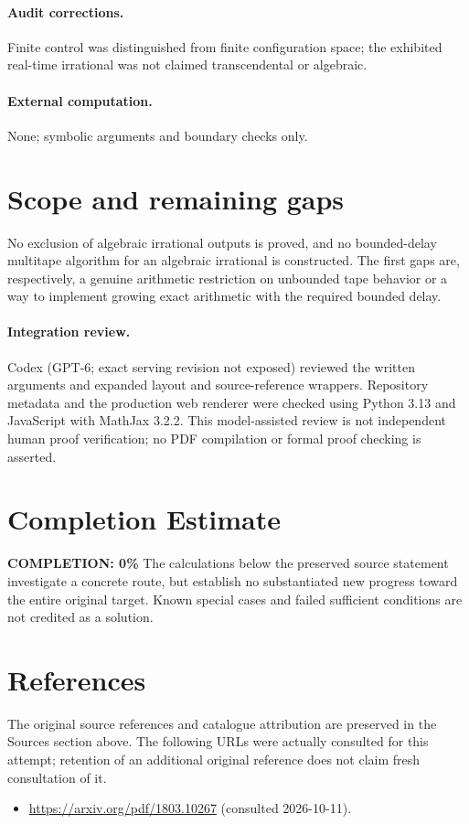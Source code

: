 \documentclass[11pt]{article}
\begin{document}
\paragraph{Audit corrections.} Finite control was distinguished from finite configuration space; the exhibited real-time irrational was not claimed transcendental or algebraic.
\paragraph{External computation.} None; symbolic arguments and boundary checks only.
\section{Scope and remaining gaps}
No exclusion of algebraic irrational outputs is proved, and no bounded-delay
multitape algorithm for an algebraic irrational is constructed. The first gaps
are, respectively, a genuine arithmetic restriction on unbounded tape behavior
or a way to implement growing exact arithmetic with the required bounded delay.
\paragraph{Integration review.} Codex (GPT-6; exact serving revision not exposed) reviewed the written arguments and expanded layout and source-reference wrappers. Repository metadata and the production web renderer were checked using Python 3.13 and JavaScript with MathJax 3.2.2. This model-assisted review is not independent human proof verification; no PDF compilation or formal proof checking is asserted.

\section{Completion Estimate}
\noindent\textbf{COMPLETION: 0\%}
The calculations below the preserved source statement investigate a concrete route,
but establish no substantiated new progress toward the entire original target.
Known special cases and failed sufficient conditions are not credited as a solution.
\section{References}
The original source references and catalogue attribution are preserved in the
Sources section above. The following URLs were actually consulted for this attempt;
retention of an additional original reference does not claim fresh consultation of it.
\begin{itemize}
\item \url{https://arxiv.org/pdf/1803.10267} (consulted 2026-10-11). 
\end{itemize}
\end{document}
